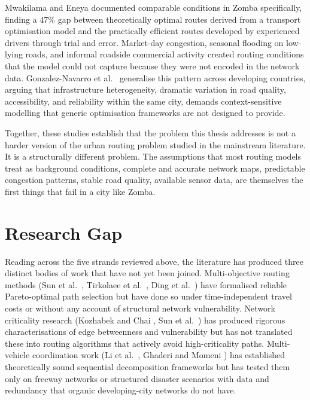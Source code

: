 \documentclass[paper=A4, 12pt, mathscr]{report}
\begin{document}
	Mwakilama and Eneya \cite{8} documented comparable conditions in Zomba
	specifically, finding a 47\% gap between theoretically optimal routes derived
	from a transport optimisation model and the practically efficient routes
	developed by experienced drivers through trial and error. Market-day
	congestion, seasonal flooding on low-lying roads, and informal roadside
	commercial activity created routing conditions that the model could not
	capture because they were not encoded in the network data. Gonzalez-Navarro
	et al.\ \cite{gonzalez2023} generalise this pattern across developing
	countries, arguing that infrastructure heterogeneity, dramatic variation in
	road quality, accessibility, and reliability within the same city, demands
	context-sensitive modelling that generic optimisation frameworks are not
	designed to provide.
	
	Together, these studies establish that the problem this thesis addresses is
	not a harder version of the urban routing problem studied in the mainstream
	literature. It is a structurally different problem. The assumptions that most
	routing models treat as background conditions, complete and accurate network
	maps, predictable congestion patterns, stable road quality, available sensor
	data, are themselves the first things that fail in a city like Zomba.
	
	
	\section{Research Gap}
	\label{sec:lit_gap}
	
	Reading across the five strands reviewed above, the literature has produced
	three distinct bodies of work that have not yet been joined. Multi-objective
	routing methods (Sun et al.\ \cite{6}, Tirkolaee et al.\ \cite{tirkolaee2020},
	Ding et al.\ \cite{ding2021}) have formalised reliable Pareto-optimal path
	selection but have done so under time-independent travel costs or without
	any account of structural network vulnerability. Network criticality research
	(Kozhabek and Chai \cite{11}, Sun et al.\ \cite{6}) has produced rigorous
	characterisations of edge betweenness and vulnerability but has not
	translated these into routing algorithms that actively avoid high-criticality
	paths. Multi-vehicle coordination work (Li et al.\ \cite{12,14}, Ghaderi
	and Momeni \cite{7}) has established theoretically sound sequential
	decomposition frameworks but has tested them only on freeway networks or
	structured disaster scenarios with data and redundancy that organic
	developing-city networks do not have.
	
\end{document}
